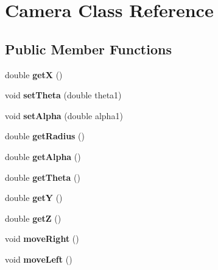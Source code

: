 \hypertarget{class_camera}{}\section{Camera Class Reference}
\label{class_camera}
\subsection*{Public Member Functions}
\begin{DoxyCompactItemize}
\item 
\mbox{\label{class_camera_a1af03aa27aafc84436078eb11e16c0e3}} 
double {\bfseries getX} ()
\item 
\mbox{\label{class_camera_a32713758e0f60a348681556d36e3d304}} 
void {\bfseries set\+Theta} (double theta1)
\item 
\mbox{\label{class_camera_a32491a1d934338e0e3f8303186bdb06e}} 
void {\bfseries set\+Alpha} (double alpha1)
\item 
\mbox{\label{class_camera_abbc0b4141e683264260e325d239d7dcc}} 
double {\bfseries get\+Radius} ()
\item 
\mbox{\label{class_camera_a95c51b540e29bab525c14c43fbe5f6e4}} 
double {\bfseries get\+Alpha} ()
\item 
\mbox{\label{class_camera_a07a610dd1015770d57b1370547154743}} 
double {\bfseries get\+Theta} ()
\item 
\mbox{\label{class_camera_a1a99eaab2127fcc0af20e8e06e9a7eb0}} 
double {\bfseries getY} ()
\item 
\mbox{\label{class_camera_aead34062d4bdb7fca1241a480d3f563f}} 
double {\bfseries getZ} ()
\item 
\mbox{\label{class_camera_acf2f00de2e99af1fcd9b5e770fce7ae3}} 
void {\bfseries move\+Right} ()
\item 
\mbox{\label{class_camera_acbf35947eb5d887a76538e9525cf34a0}} 
void {\bfseries move\+Left} ()
\item 

\end{DoxyCompactItemize}
